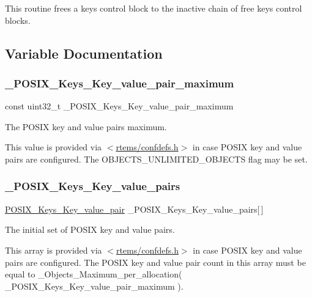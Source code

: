 This routine frees a keys control block to the inactive chain of free keys control blocks. 

\subsection{Variable Documentation}
\mbox{\label{group__POSIX__KEY_gabf185659e6528c2306cdc59f5d031b45}} 
\subsubsection{\texorpdfstring{\_POSIX\_Keys\_Key\_value\_pair\_maximum}{\_POSIX\_Keys\_Key\_value\_pair\_maximum}}
{\footnotesize\ttfamily const uint32\+\_\+t \+\_\+\+P\+O\+S\+I\+X\+\_\+\+Keys\+\_\+\+Key\+\_\+value\+\_\+pair\+\_\+maximum}



The P\+O\+S\+IX key and value pairs maximum. 

This value is provided via $<$\mbox{\hyperlink{confdefs_8h}{rtems/confdefs.\+h}}$>$ in case P\+O\+S\+IX key and value pairs are configured. The O\+B\+J\+E\+C\+T\+S\+\_\+\+U\+N\+L\+I\+M\+I\+T\+E\+D\+\_\+\+O\+B\+J\+E\+C\+TS flag may be set. \mbox{\label{group__POSIX__KEY_ga9b1c7cc891d4110fdd12f849a0304adf}} 
\subsubsection{\texorpdfstring{\_POSIX\_Keys\_Key\_value\_pairs}{\_POSIX\_Keys\_Key\_value\_pairs}}
{\footnotesize\ttfamily \mbox{\hyperlink{structPOSIX__Keys__Key__value__pair}{P\+O\+S\+I\+X\+\_\+\+Keys\+\_\+\+Key\+\_\+value\+\_\+pair}} \+\_\+\+P\+O\+S\+I\+X\+\_\+\+Keys\+\_\+\+Key\+\_\+value\+\_\+pairs\mbox{[}$\,$\mbox{]}}



The initial set of P\+O\+S\+IX key and value pairs. 

This array is provided via $<$\mbox{\hyperlink{confdefs_8h}{rtems/confdefs.\+h}}$>$ in case P\+O\+S\+IX key and value pairs are configured. The P\+O\+S\+IX key and value pair count in this array must be equal to \+\_\+\+Objects\+\_\+\+Maximum\+\_\+per\+\_\+allocation( \+\_\+\+P\+O\+S\+I\+X\+\_\+\+Keys\+\_\+\+Key\+\_\+value\+\_\+pair\+\_\+maximum ). 